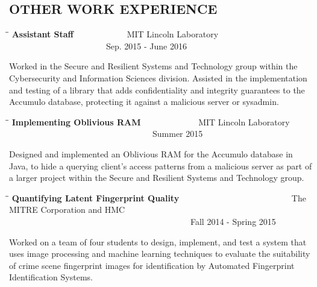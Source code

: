 \documentclass{res}
\begin{document}
\begin{resume}
\section{OTHER WORK EXPERIENCE}
\vspace{0in}
    \begin{tabbing}
   \hspace{3in}\=  \hspace{1.63in}\= \kill %
    {\bf Assistant Staff} \>~~~~~~~~~~~~MIT Lincoln Laboratory \>~~~~~~~~~~~~~~~~~~~~~~~Sep. 2015 - June 2016\\                       
   \end{tabbing}\vspace{-30pt}      %
    Worked in the Secure and Resilient Systems and Technology group within the Cybersecurity and Information Sciences division.  Assisted in the implementation and testing of a library that adds confidentiality and integrity guarantees to the Accumulo database, protecting it against a malicious server or sysadmin.

   \begin{tabbing}
   \hspace{3in}\=  \hspace{1.63in}\= \kill %
    {\bf Implementing Oblivious RAM} \>~~~~~~~~~~~~~MIT Lincoln Laboratory \>~~~~~~~~~~~~~~~~~~~~~~~~~~~~~~~~~~Summer 2015\\                       
   \end{tabbing}\vspace{-30pt}      %
    Designed and implemented an Oblivious RAM for the Accumulo database in Java, to hide a querying client's access patterns from a malicious server as part of a larger project within the Secure and Resilient Systems and Technology group.

   \begin{tabbing}
   \hspace{2in}\=  \hspace{1.63in}\= \kill %
    {\bf Quantifying Latent Fingerprint Quality} \>~~~~~~~~~~~~~~~~~~~~~~~~~~The MITRE Corporation
    and HMC  \>~~~~~~~~~~~~~~~~~~~~~~~~~~~~~~~~~~~~~~~~~~~Fall 2014 - Spring 2015\\                       
   \end{tabbing}\vspace{-30pt}      %
    Worked on a team of four students to design, implement, and test a system that uses image processing and machine learning techniques to evaluate the suitability of crime scene fingerprint images for identification by Automated Fingerprint Identification Systems.


\end{resume}
\end{document}
